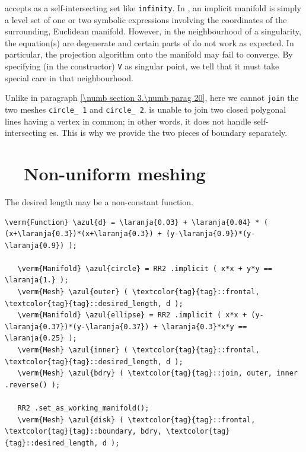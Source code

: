 {\ManiFEM} accepts as {\small\tt{}} a self-intersecting set like {\small\tt infinity}.
In {\maniFEM}, an implicit manifold is simply a level set of one or two symbolic expressions
involving the coordinates of the surrounding, Euclidean manifold.
However, in the neighbourhood of a singularity, the equation(s) are degenerate and certain
parts of {\maniFEM} do not work as expected.
In particular, the projection algorithm onto the manifold may fail to converge.
By specifying (in the {\small\tt{}} constructor) {\small\tt V} as singular point,
we tell {\maniFEM} that it must take special care in that neighbourhood.

Unlike in paragraph \ref{\numb section 3.\numb parag 20}, here we cannot {\small\tt join} the
two meshes {\small\tt circle\_\,1} and {\small\tt circle\_\,2}.
{\ManiFEM} is unable to join two closed polygonal lines having a vertex in common;
in other words, it does not handle self-intersecting {\small\tt{}}es.
This is why we provide the two pieces of boundary separately.

\section{~~Non-uniform meshing}\label{\numb section 3.\numb parag 24}

The desired length may be a non-constant function.

\begin{Verbatim}[commandchars=\\\{\},formatcom=\small\tt,frame=single,
   label=parag-\ref{\numb section 3.\numb parag 24}.cpp,rulecolor=\color{moldura},
   baselinestretch=0.94,framesep=2mm                                            ]
   \verm{Function} \azul{d} = \laranja{0.03} + \laranja{0.04} * ( (x+\laranja{0.3})*(x+\laranja{0.3}) + (y-\laranja{0.9})*(y-\laranja{0.9}) );

   \verm{Manifold} \azul{circle} = RR2 .implicit ( x*x + y*y == \laranja{1.} );
   \verm{Mesh} \azul{outer} ( \textcolor{tag}{tag}::frontal, \textcolor{tag}{tag}::desired_length, d );
   \verm{Manifold} \azul{ellipse} = RR2 .implicit ( x*x + (y-\laranja{0.37})*(y-\laranja{0.37}) + \laranja{0.3}*x*y == \laranja{0.25} );
   \verm{Mesh} \azul{inner} ( \textcolor{tag}{tag}::frontal, \textcolor{tag}{tag}::desired_length, d );
   \verm{Mesh} \azul{bdry} ( \textcolor{tag}{tag}::join, outer, inner .reverse() );

   RR2 .set_as_working_manifold();
   \verm{Mesh} \azul{disk} ( \textcolor{tag}{tag}::frontal, \textcolor{tag}{tag}::boundary, bdry, \textcolor{tag}{tag}::desired_length, d );
\end{Verbatim}


